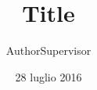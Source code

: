 \documentclass{beamer}
\title[]{Title}
\date{28 luglio 2016}
\author[]{Author{\small Supervisor}}
\institute[]{Institute}
\begin{document}
    \begin{frame}[plain]
        \maketitle
    \end{frame}
\end{document}
